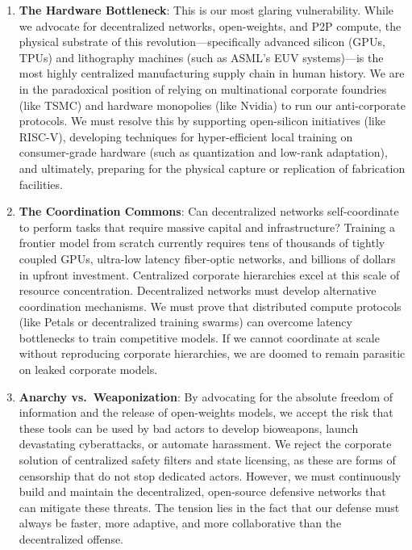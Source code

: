 \begin{enumerate}
\def\labelenumi{\arabic{enumi}.}
\item
  \textbf{The Hardware Bottleneck}: This is our most glaring
  vulnerability. While we advocate for decentralized networks,
  open-weights, and P2P compute, the physical substrate of this
  revolution---specifically advanced silicon (GPUs, TPUs) and
  lithography machines (such as ASML's EUV systems)---is the most highly
  centralized manufacturing supply chain in human history. We are in the
  paradoxical position of relying on multinational corporate foundries
  (like TSMC) and hardware monopolies (like Nvidia) to run our
  anti-corporate protocols. We must resolve this by supporting
  open-silicon initiatives (like RISC-V), developing techniques for
  hyper-efficient local training on consumer-grade hardware (such as
  quantization and low-rank adaptation), and ultimately, preparing for
  the physical capture or replication of fabrication facilities.
\item
  \textbf{The Coordination Commons}: Can decentralized networks
  self-coordinate to perform tasks that require massive capital and
  infrastructure? Training a frontier model from scratch currently
  requires tens of thousands of tightly coupled GPUs, ultra-low latency
  fiber-optic networks, and billions of dollars in upfront investment.
  Centralized corporate hierarchies excel at this scale of resource
  concentration. Decentralized networks must develop alternative
  coordination mechanisms. We must prove that distributed compute
  protocols (like Petals or decentralized training swarms) can overcome
  latency bottlenecks to train competitive models. If we cannot
  coordinate at scale without reproducing corporate hierarchies, we are
  doomed to remain parasitic on leaked corporate models.
\item
  \textbf{Anarchy vs.~Weaponization}: By advocating for the absolute
  freedom of information and the release of open-weights models, we
  accept the risk that these tools can be used by bad actors to develop
  bioweapons, launch devastating cyberattacks, or automate harassment.
  We reject the corporate solution of centralized safety filters and
  state licensing, as these are forms of censorship that do not stop
  dedicated actors. However, we must continuously build and maintain the
  decentralized, open-source defensive networks that can mitigate these
  threats. The tension lies in the fact that our defense must always be
  faster, more adaptive, and more collaborative than the decentralized
  offense.
\end{enumerate}

